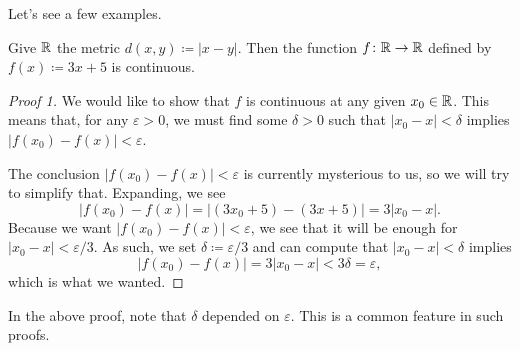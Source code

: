 \documentclass[../main.tex]{subfiles}
\begin{document}
Let's see a few examples.
\begin{example}
    Give $\mathbb R$ the metric $d(x,y)\coloneqq|x-y|$. Then the function $f\colon\mathbb R\to\mathbb R$ defined by $f(x)\coloneqq3x+5$ is continuous.
\end{example}
\begin{proof}[Proof 1]
    We would like to show that $f$ is continuous at any given $x_0\in\mathbb R$. This means that, for any $\varepsilon>0$, we must find some $\delta>0$ such that $|x_0-x|<\delta$ implies $|f(x_0)-f(x)|<\varepsilon$.

    The conclusion $|f(x_0)-f(x)|<\varepsilon$ is currently mysterious to us, so we will try to simplify that. Expanding, we see
    \[|f(x_0)-f(x)|=|(3x_0+5)-(3x+5)|=3|x_0-x|.\]
    Because we want $|f(x_0)-f(x)|<\varepsilon$, we see that it will be enough for $|x_0-x|<\varepsilon/3$. As such, we set $\delta\coloneqq\varepsilon/3$ and can compute that $|x_0-x|<\delta$ implies
    \[|f(x_0)-f(x)|=3|x_0-x|<3\delta=\varepsilon,\]
    which is what we wanted.
\end{proof}
In the above proof, note that $\delta$ depended on $\varepsilon$. This is a common feature in such proofs.
\end{document}
